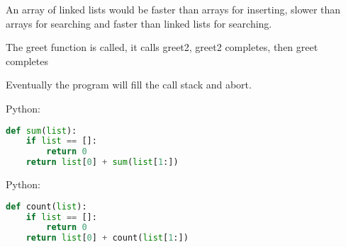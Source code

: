 \begin{problem}{2.5}
\end{problem}
\begin{solution}
An array of linked lists would be faster than arrays for inserting, slower than arrays for searching and faster than linked lists for searching.
\end{solution}


\begin{problem}{3.1}
\end{problem}
\begin{solution}
The greet function is called, it calls greet2, greet2 completes, then greet completes
\end{solution}


\begin{problem}{3.2}
\end{problem}
\begin{solution}
Eventually the program will fill the call stack and abort.
\end{solution}


\begin{problem}{4.1}
\end{problem}
\begin{solution} 
Python: 
\begin{lstlisting}[language=Python]
def sum(list):
	if list == []:
		return 0
	return list[0] + sum(list[1:])
\end{lstlisting}
\end{solution}

\begin{problem}{4.2}
\end{problem}
\begin{solution}
 
Python: 
\begin{lstlisting}[language=Python]
def count(list):
	if list == []:
		return 0
	return list[0] + count(list[1:])
\end{lstlisting}
\end{solution}

\begin{problem}{4.3}
\end{problem}
\begin{solution}
\end{solution}

\begin{problem}{4.4}
\end{problem}
\begin{solution}
\end{solution}

